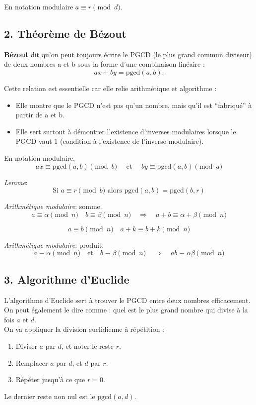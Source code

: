 En notation modulaire $a \equiv r \pmod{d}$.

\subsection*{2. Théorème de Bézout}
\textbf{Bézout} dit qu’on peut toujours écrire le PGCD (le plus grand commun diviseur) de deux nombres a et b sous la forme d'une combinaison linéaire :
\[
ax + by = \text{pgcd}(a,b).
\]

Cette relation est essentielle car elle relie arithmétique et algorithme : 
\begin{itemize}
    \item Elle montre que le PGCD n’est pas qu’un nombre, mais qu’il est “fabriqué” à partir de a et b.
    \item Elle sert surtout à démontrer l’existence d’inverses modulaires lorsque le PGCD vaut 1 (condition à l'existence de l'inverse modulaire).
\end{itemize}

\newpage
En notation modulaire,
\[
ax \equiv \text{pgcd}(a,b) \pmod{b} \quad \text{ et } \quad by \equiv \text{pgcd}(a,b) \pmod{a}
\]

\textit{Lemme}:
\[
\text{Si } a \equiv r \pmod{b} \text{ alors } \text{pgcd}(a, b) = \text{pgcd}(b, r)
\]

\textit{Arithmétique modulaire}: somme. 
\[
a \equiv \alpha \pmod{n} \quad b \equiv \beta \pmod{n}
\quad \Rightarrow \quad a + b \equiv \alpha + \beta \pmod{n}
\]

\[
a \equiv b \pmod{n} \quad a + k \equiv b + k \pmod{n}
\]

\textit{Arithmétique modulaire}: produit. 
\[
a \equiv \alpha \pmod{n} \quad \text{et} \quad b \equiv \beta \pmod{n}
\quad \Rightarrow \quad a b \equiv \alpha \beta \pmod{n}
\]

\subsection*{3. Algorithme d'Euclide}
L'algorithme d'Euclide sert à trouver le PGCD entre deux nombres efficacement. On peut également le dire comme : quel est le plus grand nombre qui divise à la fois \( a \) et \( d \). \\

On va appliquer la division euclidienne à répétition :
\begin{enumerate}
    \item Diviser \( a \) par \( d \), et noter le reste \( r \).
    \item Remplacer \( a \) par \( d \), et \( d \) par \( r \).
    \item Répéter jusqu'à ce que \( r = 0 \). 
\end{enumerate}
Le dernier reste non nul est le \( \text{pgcd}(a, d) \). \\

